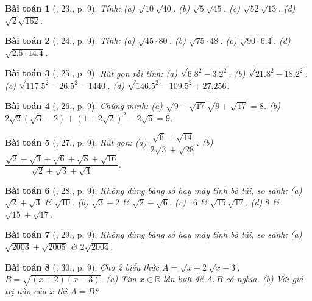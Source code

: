 \documentclass{article}
\newtheorem{baitoan}{Bài toán}
\begin{document}
\begin{baitoan}[\cite{SBT_Toan_9_tap_1}, 23., p. 9]
	Tính: (a) $\sqrt{10}\sqrt{40}$. (b) $\sqrt{5}\sqrt{45}$. (c) $\sqrt{52}\sqrt{13}$. (d) $\sqrt{2}\sqrt{162}$.
\end{baitoan}

\begin{baitoan}[\cite{SBT_Toan_9_tap_1}, 24., p. 9]
	Tính: (a) $\sqrt{45\cdot80}$. (b) $\sqrt{75\cdot48}$. (c) $\sqrt{90\cdot6.4}$. (d) $\sqrt{2.5\cdot14.4}$.
\end{baitoan}

\begin{baitoan}[\cite{SBT_Toan_9_tap_1}, 25., p. 9]
	Rút gọn rồi tính: (a) $\sqrt{6.8^2 - 3.2^2}$. (b) $\sqrt{21.8^2 - 18.2^2}$. (c) $\sqrt{117.5^2 - 26.5^2 - 1440}$.  (d) $\sqrt{146.5^2 - 109.5^2 + 27.256}$.
\end{baitoan}

\begin{baitoan}[\cite{SBT_Toan_9_tap_1}, 26., p. 9]
	Chứng minh: (a) $\sqrt{9 - \sqrt{17}}\sqrt{9 + \sqrt{17}} = 8$. (b) $2\sqrt{2}(\sqrt{3} - 2) + (1 + 2\sqrt{2})^2 - 2\sqrt{6} = 9$.
\end{baitoan}

\begin{baitoan}[\cite{SBT_Toan_9_tap_1}, 27., p. 9]
	Rút gọn: (a) $\dfrac{\sqrt{6} + \sqrt{14}}{2\sqrt{3} + \sqrt{28}}$. (b) $\dfrac{\sqrt{2} + \sqrt{3} + \sqrt{6} + \sqrt{8} + \sqrt{16}}{\sqrt{2} + \sqrt{3} + \sqrt{4}}$.
\end{baitoan}

\begin{baitoan}[\cite{SBT_Toan_9_tap_1}, 28., p. 9]
	Không dùng bảng số hay máy tính bỏ túi, so sánh: (a) $\sqrt{2} + \sqrt{3}$ \& $\sqrt{10}$. (b) $\sqrt{3} + 2$ \& $\sqrt{2} + \sqrt{6}$. (c) $16$ \& $\sqrt{15}\sqrt{17}$. (d) $8$ \& $\sqrt{15} + \sqrt{17}$.
\end{baitoan}

\begin{baitoan}[\cite{SBT_Toan_9_tap_1}, 29., p. 9]
	Không dùng bảng số hay máy tính bỏ túi, so sánh: (a) $\sqrt{2003} + \sqrt{2005}$ \& $2\sqrt{2004}$.
\end{baitoan}

\begin{baitoan}[\cite{SBT_Toan_9_tap_1}, 30., p. 9]
	Cho 2 biểu thức $A = \sqrt{x + 2}\sqrt{x - 3}$, $B = \sqrt{(x + 2)(x - 3)}$. (a) Tìm $x\in\mathbb{R}$ lần lượt để $A,B$  có nghĩa. (b) Với giá trị nào của $x$ thì $A = B$?
\end{baitoan}
\end{document}
